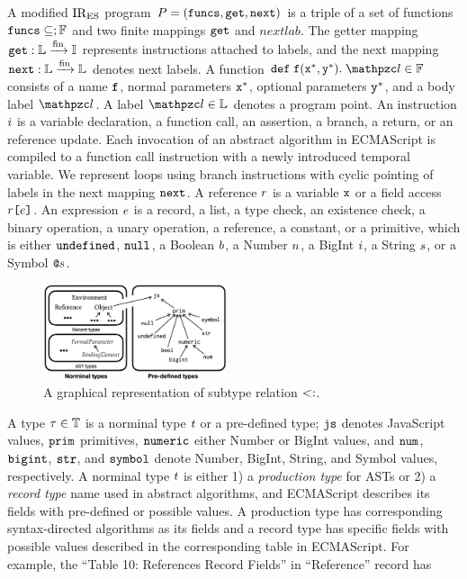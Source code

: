A modified ${\text{IR}_\text{ES}}$ program $P = (\texttt{funcs}, \texttt{get}, \texttt{next})$ is a triple of
a set of functions $\texttt{funcs} \subseteq ; \mathbb{F}$ and two finite mappings
$\texttt{get}$ and $nextlab$.  The getter mapping $\texttt{get}: \mathbb{L} \xrightarrow{\text{fin}} \mathbb{I}$
represents instructions attached to labels, and the next mapping $\texttt{next}:
\mathbb{L} \xrightarrow{\text{fin}} \mathbb{L}$ denotes next labels.  A function $\kwdef \; \f (\x^*,
\y^*). \; \lab \in \funcset$ consists of a name $\texttt{f}$, normal parameters $\texttt{x}^*$,
optional parameters $\texttt{y}^*$, and a body label $\lab$.  A label $\lab \in \labset$
denotes a program point.  An instruction $i$ is a variable declaration, a
function call, an assertion, a branch, a return, or an reference update.  Each
invocation of an abstract algorithm in ECMAScript is compiled to a function call
instruction with a newly introduced temporal variable.  We represent loops using
branch instructions with cyclic pointing of labels in the next mapping
$\texttt{next}$.  A reference $r$ is a variable $\texttt{x}$ or a field access $r
\texttt{[} e \texttt{]}$.  An expression $e$ is a record, a list, a type check, an
existence check, a binary operation, a unary operation, a reference, a constant,
or a primitive, which is either $\texttt{undefined}$, $\texttt{null}$, a Boolean $b$, a
Number $n$, a BigInt $i$, a String $s$, or a Symbol $\texttt{@}s$.

\begin{figure}
  \centering
  \includegraphics[width=0.48\textwidth]{img/subtype}
  \vspace*{-1.5em}
  \caption{A graphical representation of subtype relation $<:$.}
  \label{fig:subtype}
  \vspace*{-1.5em}
\end{figure}

A type $\tau \in \mathbb{T}$ is a norminal type $t$ or a pre-defined type;
$\texttt{js}$ denotes JavaScript values, $\texttt{prim}$ primitives, $\texttt{numeric}$ either Number
or BigInt values, and $\texttt{num}$, $\texttt{bigint}$, $\texttt{str}$, and $\texttt{symbol}$ denote Number,
BigInt, String, and Symbol values, respectively.  A norminal type $t$ is
either 1) a \textit{production type} for ASTs or 2) a \textit{record type} name
used in abstract algorithms, and ECMAScript describes its fields with
pre-defined or possible values.  A production type has corresponding
syntax-directed algorithms as its fields and a record type has specific fields
with possible values described in the corresponding table in ECMAScript.  For
example, the ``Table 10: References Record Fields'' in 
``Reference'' record has 

